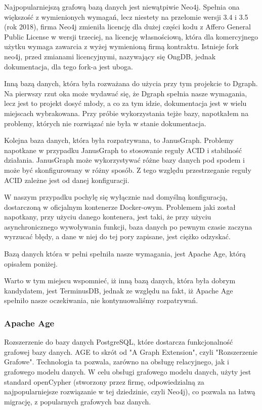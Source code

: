 \documentclass[a4paper, 12pt]{article}
\begin{document}
Najpopularniejszą grafową bazą danych jest niewątpiwie Neo4j. Spełnia ona większość z wymienionych wymagań, lecz niestety na przełomie wersji 3.4 i 3.5 (rok 2018), firma Neo4j zmieniła licencję dla dużej części kodu z Affero General Public License w wersji trzeciej, na licencję własnościową, która dla komercyjnego użytku wymaga zawarcia z wyżej wymienioną firmą kontraktu.\cite{neo4jLicenseChangeBlog} Istnieje fork neo4j, przed zmianami licencyjnymi, nazywający się OngDB, jednak dokumentacja, dla tego fork-a jest uboga.

Inną bazą danych, która była rozważana do użycia przy tym projekcie to Dgraph. Na pierwszy rzut oka może wydawać się, że Dgraph spełnia nasze wymagania, lecz jest to projekt dosyć młody, a co za tym idzie, dokumentacja jest w wielu miejscach wybrakowana. Przy próbie wykorzystania tejże bazy, napotkałem na problemy, których nie rozwiązać nie była w stanie dokumentacja.

Kolejna baza danych, która była rozpatrywana, to JanusGraph. Problemy napotkane w przypadku JanusGraph to stosowanie reguły ACID i stabilność działania. JanusGraph może wykorzystywać różne bazy danych pod spodem i może być skonfigurowany w różny sposób. Z tego względu przestrzeganie reguły ACID zależne jest od danej konfiguracji.

W naszym przypadku pochylę się wyłącznie nad domyślną konfiguracją, dostarczoną w oficjalnym kontenerze Docker-owym. Problemem jaki został napotkany, przy użyciu danego kontenera, jest taki, że przy użyciu asynchronicznego wywoływania funkcji, baza danych po pewnym czasie zaczyna wyrzucać błędy, a dane w niej do tej pory zapisane, jest ciężko odzyskać.

Bazą danych która w pełni spełniła nasze wymagania, jest Apache Age, którą opisałem poniżej.

Warto w tym miejscu wspomnieć, iż inną bazą danych, która była dobrym kandydatem, jest TerminusDB, jednak ze względu na fakt, iż Apache Age spełniło nasze oczekiwania, nie kontynuowaliśmy rozpatrywań.

\subsubsection{Apache Age}
Rozszerzenie do bazy danych PostgreSQL, które dostarcza funkcjonalność grafowej bazy danych. AGE to skrót od "A Graph Extension", czyli "Rozszerzenie Grafowe". Technologia ta pozwala, zarówno na obsługę relacyjnego, jak i grafowego modelu danych. W celu obsługi grafowego modelu danych, użyty jest standard openCypher (stworzony przez firmę, odpowiedzialną za najpopularniejsze rozwiązanie w tej dziedzinie, czyli Neo4j\cite{openCypherAbout}), co pozwala na łatwą migrację, z popularnych grafowych baz danych.\cite{ApacheAGEOverview}
\end{document}
